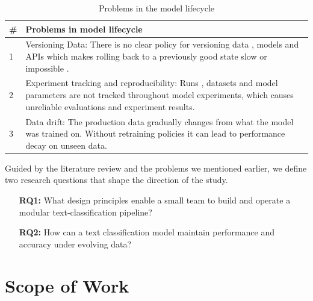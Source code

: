 \begin{table}[htbp]
    \centering
    \begin{tabularx}{\linewidth}{@{}lX@{}}
        \toprule
        \textbf{\#} & \textbf{Problems in model lifecycle}                                                                                                                                                                      \\
        \midrule
        1           & Versioning Data: There is no clear policy for versioning data , models and APIs which makes rolling back to a previously good state slow or impossible \cite{steidl:2023}.                                \\
        2           & Experiment tracking and reproducibility: Runs , datasets and model parameters are not tracked throughout model experiments, which causes unreliable evaluations and experiment results. \cite{idowu:2024} \\
        3           & Data drift: The production data gradually changes from what the model was trained on. Without retraining policies it can lead to performance decay on unseen data. \cite{cossu:202}                       \\
        \bottomrule
    \end{tabularx}
    \caption{Problems in the model lifecycle}
    \label{tab:problems_lifecycle}
\end{table}



Guided by the literature review and the problems we mentioned earlier, we define two research questions that shape the direction of the study.

\begin{enumerate}
    \item[\textbf{RQ1:}] \label{rq:1} What design principles enable a small team to build and operate a modular text-classification pipeline?
    \item[\textbf{RQ2:}] \label{rq:2} How can a text classification model maintain performance and accuracy under evolving data?
\end{enumerate}

\section{Scope of Work}
